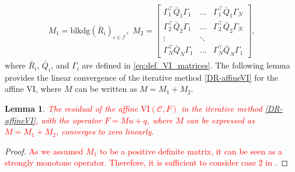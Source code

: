 \documentclass[letterpaper, 10 pt, conference]{ieeeconf}  %
\newcommand{\mc}{\mathcal}
\newcommand{\red}[1]{\textcolor{red}{#1}}
\newtheorem{lemma}[theorem]{Lemma}
\begin{document}
\begin{align*}
    M_1 = \mathrm{blkdg}(\bar{R}_i)_{i\in\mc I}, \,\, M_2 = \begin{bmatrix}
            \Gamma_1^\top\bar{Q}_1\Gamma_1 & \dots &\Gamma_1^\top\bar{Q}_1\Gamma_N \\
            \Gamma_2^\top\bar{Q}_2\Gamma_1 & \dots & \Gamma_2^\top\bar{Q}_2\Gamma_N \\
            \vdots & \ddots & \\
            \Gamma_N^\top\bar{Q}_N\Gamma_1 & \dots & \Gamma_N^\top\bar{Q}_N\Gamma_1 
        \end{bmatrix},
\end{align*}
where $\bar{R}_i$, $\bar{Q}_i$, and $\Gamma_i$ are defined in \eqref{eq:def_VI_matrices}. The following lemma provides the linear convergence of the iterative method \eqref{DR-affineVI} for the affine VI, where $M$ can be written as $M = M_1 + M_2$.
\begin{lemma}\cite[Proposition 6]{ferris1996operator}\label{li-conv}
    \red{The residual of the affine \(\mathrm{VI}(\mathcal{C}, F)\) in the iterative method \eqref{DR-affineVI}, with the operator \( F = Mu + q \), where \( M \) can be expressed as \( M = M_1 + M_2 \), converges to zero linearly.}
\end{lemma}
\begin{proof}
   \red{As we assumed \( M_1 \) to be a positive definite matrix, it can be seen as a strongly monotone operator. Therefore, it is sufficient to consider case 2 in \cite[Proposition 6]{ferris1996operator}.}
\end{proof}

\end{document}
